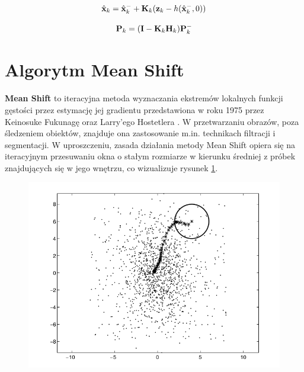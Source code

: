 \begin{equation}
\label{equ:Rozszerzony_Filtr_Kalmana_faza_korekcji_stan}
	\hat{\mathbf{x}}_k = \hat{\mathbf{x}}_k^- + \mathbf{K}_k(\mathbf{z}_k - h(\hat{\mathbf{x}}_k^-,0))
\end{equation}

\begin{equation}
\label{equ:Rozszerzony_Filtr_Kalmana_faza_korekcji_macierz_kowariancji_bledow}
	\mathbf{P}_k = (\mathbf{I} - \mathbf{K}_k \mathbf{H}_k) \mathbf{P}_k^-
\end{equation}

\section{Algorytm Mean Shift}
\label{Algorytm_Mean_Shift}

\textbf{Mean Shift} to iteracyjna metoda wyznaczania ekstremów lokalnych funkcji gęstości przez estymację jej gradientu przedstawiona w roku 1975 przez Keinosuke Fukunagę oraz Larry'ego Hostetlera \cite{Comaniciu1999}. W przetwarzaniu obrazów, poza śledzeniem obiektów, znajduje ona zastosowanie m.in. technikach filtracji i segmentacji. W uproszczeniu, zasada działania metody Mean Shift opiera się na iteracyjnym przesuwaniu okna o stałym rozmiarze w kierunku średniej z próbek znajdujących się w jego wnętrzu, co wizualizuje rysunek \ref{fig:Mean_Shift_przyklad}.

\begin{figure}[!htb]
	\begin{center}
		\includegraphics[width=12cm]{images/mean_shift_example.png}
	\end{center}	
\label{fig:Mean_Shift_przyklad}
\end{figure}

